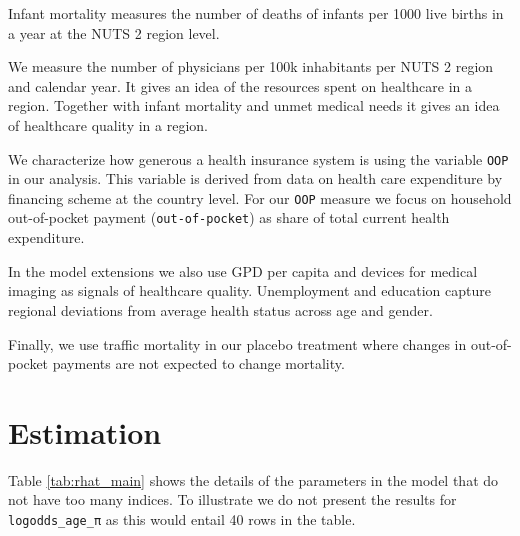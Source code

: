 \documentclass[a4paper,12pt]{article}
\begin{document}
Infant mortality measures the number of deaths of infants per 1000 live births in a year at the NUTS 2 region level.

We measure the number of physicians per 100k inhabitants per NUTS 2 region and calendar year. It gives an idea of the resources spent on healthcare in a region. Together with infant mortality and unmet medical needs it gives an idea of healthcare quality in a region.

We characterize how generous a health insurance system is using the variable \texttt{OOP} in our analysis. This variable is derived from data on health care expenditure by financing scheme at the country level. For our \texttt{OOP} measure we focus on household out-of-pocket payment (\texttt{out-of-pocket}) as share of total current health expenditure.

In the model extensions we also use GPD per capita and devices for medical imaging as signals of healthcare quality. Unemployment and education capture regional deviations from average health status across age and gender.

Finally, we use traffic mortality in our placebo treatment where changes in out-of-pocket payments are not expected to change mortality.
\section{Estimation}
\label{sec:orgf5c8040}

Table \ref{tab:rhat_main} shows the details of the parameters in the model that do not have too many indices. To illustrate we do not present the results for \texttt{logodds\_age\_π} as this would entail 40 rows in the table.
\end{document}
